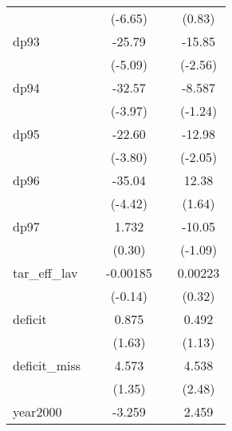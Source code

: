 {\begin{tabular}{l*{4}{c}}
            &                     &     (-6.65)         &                     &      (0.83)         \\
[1em]
dp93        &                     &      -25.79\sym{***}&                     &      -15.85\sym{*}  \\
            &                     &     (-5.09)         &                     &     (-2.56)         \\
[1em]
dp94        &                     &      -32.57\sym{***}&                     &      -8.587         \\
            &                     &     (-3.97)         &                     &     (-1.24)         \\
[1em]
dp95        &                     &      -22.60\sym{***}&                     &      -12.98\sym{*}  \\
            &                     &     (-3.80)         &                     &     (-2.05)         \\
[1em]
dp96        &                     &      -35.04\sym{***}&                     &       12.38         \\
            &                     &     (-4.42)         &                     &      (1.64)         \\
[1em]
dp97        &                     &       1.732         &                     &      -10.05         \\
            &                     &      (0.30)         &                     &     (-1.09)         \\
[1em]
tar\_eff\_lav &                     &    -0.00185         &                     &     0.00223         \\
            &                     &     (-0.14)         &                     &      (0.32)         \\
[1em]
deficit     &                     &       0.875         &                     &       0.492         \\
            &                     &      (1.63)         &                     &      (1.13)         \\
[1em]
deficit\_miss&                     &       4.573         &                     &       4.538\sym{*}  \\
            &                     &      (1.35)         &                     &      (2.48)         \\
[1em]
year2000    &                     &      -3.259         &                     &       2.459         \\

\end{tabular}}
